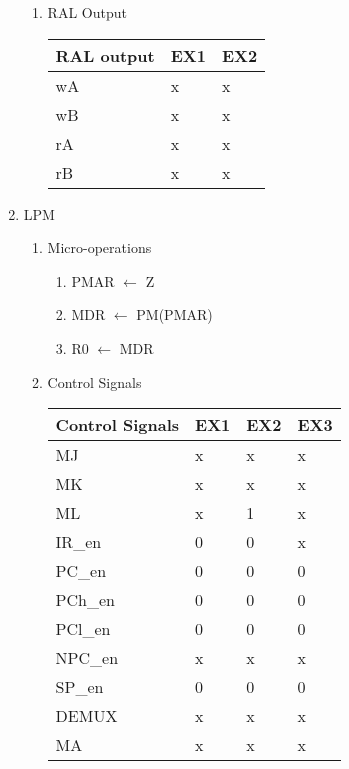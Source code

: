 \documentclass[12pt,letterpaper]{article}
\begin{document}
\begin{enumerate}
\begin{enumerate}
        \item RAL Output\\
            \begin{tabular}{l l l}
                 RAL output & EX1 & EX2 \\
                 \hline
                 wA & x & x \\
                 wB & x & x \\
                 rA & x & x \\
                 rB & x & x \\
            \end{tabular}
    \end{enumerate}



    \item LPM
    \begin{enumerate}
        \item Micro-operations \\
            \begin{enumerate}[i]
                \item PMAR $\leftarrow$ Z
                \item MDR $\leftarrow$ PM(PMAR)
                \item R0 $\leftarrow$ MDR
            \end{enumerate}
        \item Control Signals\\
            \begin{tabular}{l l l l}
                 Control Signals & EX1 & EX2 & EX3\\
                 \hline
                 MJ & x & x & x \\
                 MK & x & x & x \\
                 ML & x & 1 & x \\
                 IR\_en & 0 & 0 & x \\
                 PC\_en & 0 & 0 & 0 \\
                 PCh\_en & 0 & 0 & 0\\
                 PCl\_en & 0 & 0 & 0\\
                 NPC\_en & x & x & x\\
                 SP\_en & 0 & 0 & 0\\
                 DEMUX & x & x & x \\
                 MA & x & x & x \\

\end{tabular}
\end{enumerate}
\end{enumerate}
\end{document}

